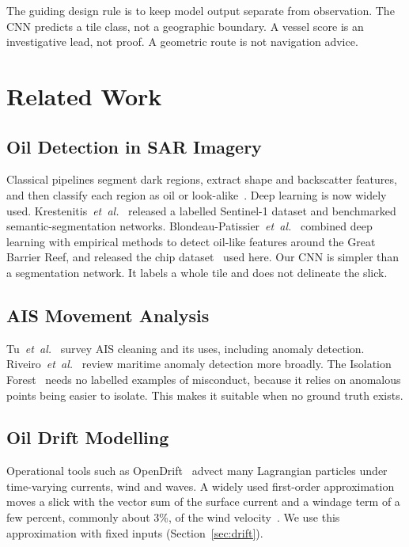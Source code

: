 \documentclass[conference]{IEEEtran}
\begin{document}
The guiding design rule is to keep model output separate from observation. The CNN
predicts a tile class, not a geographic boundary. A vessel score is an investigative
lead, not proof. A geometric route is not navigation advice.

\section{Related Work}

\subsection{Oil Detection in SAR Imagery}
Classical pipelines segment dark regions, extract shape and backscatter features,
and then classify each region as oil or look-alike~\cite{brekke2005}. Deep learning is
now widely used. Krestenitis~\emph{et~al.}~\cite{krestenitis2019} released a labelled
Sentinel-1 dataset and benchmarked semantic-segmentation networks.
Blondeau-Patissier~\emph{et~al.}~\cite{blondeau2023} combined deep learning with
empirical methods to detect oil-like features around the Great Barrier Reef, and
released the chip dataset~\cite{csiro2022} used here. Our CNN is simpler than a
segmentation network. It labels a whole tile and does not delineate the slick.

\subsection{AIS Movement Analysis}
Tu~\emph{et~al.}~\cite{tu2018} survey AIS cleaning and its uses, including anomaly
detection. Riveiro~\emph{et~al.}~\cite{riveiro2018} review maritime anomaly detection
more broadly. The Isolation Forest~\cite{liu2008} needs no labelled examples of
misconduct, because it relies on anomalous points being easier to isolate. This makes
it suitable when no ground truth exists.

\subsection{Oil Drift Modelling}
Operational tools such as OpenDrift~\cite{dagestad2018} advect many Lagrangian
particles under time-varying currents, wind and waves. A widely used first-order
approximation moves a slick with the vector sum of the surface current and a windage
term of a few percent, commonly about 3\%, of the wind velocity~\cite{asce1996,reed1999}.
We use this approximation with fixed inputs (Section~\ref{sec:drift}).
\end{document}
